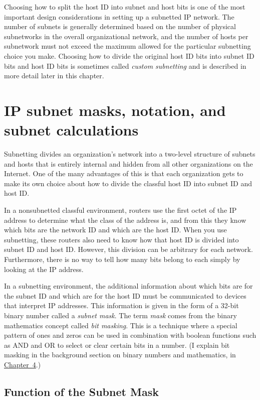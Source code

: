Choosing how to split the host ID into subnet and host bits is one of
the most important design considerations in setting up a subnetted IP
network. The number of subnets is generally determined based on the
number of physical subnetworks in the overall organizational network,
and the number of hosts per subnetwork must not exceed the maximum
allowed for the particular subnetting choice you make. Choosing how to
divide the original host ID bits into subnet ID bits and host ID bits is
sometimes called {\emph{custom subnetting}} and is described in more
detail later in this chapter.



\section{IP subnet masks, notation, and subnet calculations}

Subnetting divides an organization's network into a two-level structure of subnets
and hosts that is entirely internal and hidden from all other
organizations on the Internet. One of the many advantages of this is
that each organization gets to make its own choice about how to divide
the classful host ID into subnet ID and host ID.

In a nonsubnetted classful environment, routers use the first octet of
the IP address to determine what the class of the address is, and from
this they know which bits are the network ID and which are the host ID.
When you use subnetting, these routers also need to know how that host
ID is divided into subnet ID and host ID. However, this division can be
arbitrary for each network. Furthermore, there is no way to tell how
many bits belong to each simply by looking at the IP address.

In a subnetting environment, the additional information about which bits
are for the subnet ID and which are for the host ID must be communicated
to devices that interpret IP addresses. This information is given in the
form of a 32-bit binary number called a {\emph{subnet mask}}. The term
{\emph{mask}} comes from the binary mathematics concept called
{\emph{bit
masking}}. This is a technique where a special pattern of ones and zeros
can be used in combination with boolean functions such as AND and OR to
select or clear certain bits in a number. (I explain bit masking in the
background section on binary numbers and mathematics, in
\protect\hyperlink{ch04.html}{Chapter~4}.)

\subsection{Function of the Subnet Mask}

